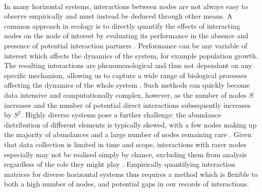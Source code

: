 \documentclass[a4,12pt]{article}
\begin{document}

    \paragraph{} 
    In many horizontal systems, interactions between nodes are not always easy to observe empirically and must instead be deduced through other means. A common approach in ecology is to directly quantify the effects of interacting nodes on the node of interest by evaluating its performance in the absence and presence of potential interaction partners \parencite{Connell1961, Grace1990}. Performance can be any variable of interest which affects the dynamics of the system, for example population growth. The resulting interactions are phenomenological and thus not dependant on any specific mechanism, allowing us to capture a wide range of biological processes affecting the dynamics of the whole system \parencite{Novak2010}. Such methods can quickly become data intensive and computationally complex, however, as the number of nodes $S$ increases and the number of potential direct interactions subsequently increases by $S^2$. Highly diverse systems pose a further challenge: the abundance distribution of different elements is typically skewed, with a few nodes making up the majority of abundances and a large number of nodes remaining rare \parencite{Fisher1943}. Given that data collection is limited in time and scope, interactions with rarer nodes especially may not be realised simply by chance, excluding them from analysis regardless of the role they might play \parencite{Olesen2011}. Empirically quantifying interaction matrices for diverse horizontal systems thus requires a method which is flexible to both a high number of nodes, and potential gaps in our records of interactions. 
\end{document}
